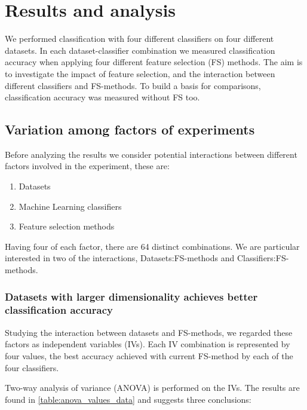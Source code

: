 \chapter{Results and analysis}

We performed classification with four different classifiers on four different datasets. In each dataset-classifier combination we measured classification accuracy when applying four different feature selection (FS) methods. The aim is to investigate the impact of feature selection, and the interaction between different classifiers and FS-methods. To build a basis for comparisons, classification accuracy was measured without FS too.

\section{Variation among factors of experiments}
\label{Variation_among_factors}

Before analyzing the results we consider potential interactions between different factors involved in the experiment, these are:

\begin{enumerate}
  \item Datasets
  \item Machine Learning classifiers
  \item Feature selection methods
\end{enumerate}

Having four of each factor, there are 64 distinct combinations. We are particular interested in two of the interactions, Datasets:FS-methods and Classifiers:FS-methods.

\subsection{Datasets with larger dimensionality achieves better classification accuracy}

Studying the interaction between datasets and FS-methods, we regarded these factors as independent variables (IVs). Each IV combination is represented by four values, the best accuracy achieved with current FS-method by each of the four classifiers.

Two-way analysis of variance (ANOVA) is performed on the IVs. The results are found in \ref{table:anova_values_data} and suggests three conclusions:



